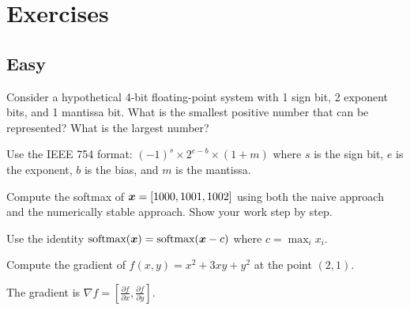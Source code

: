 
\section*{Exercises}

\subsection*{Easy}

\begin{exercisebox}[easy]
\begin{problem}
\label{prob:float-basics}
Consider a hypothetical 4-bit floating-point system with 1 sign bit, 2 exponent bits, and 1 mantissa bit. What is the smallest positive number that can be represented? What is the largest number?
\end{problem}
\begin{hintbox}
Use the IEEE 754 format: $(-1)^s \times 2^{e-b} \times (1 + m)$ where $s$ is the sign bit, $e$ is the exponent, $b$ is the bias, and $m$ is the mantissa.
\end{hintbox}
\end{exercisebox}


\begin{exercisebox}[easy]
\begin{problem}
\label{prob:softmax-stability}
Compute the softmax of $\boldsymbol{x} = [1000, 1001, 1002]$ using both the naive approach and the numerically stable approach. Show your work step by step.
\end{problem}
\begin{hintbox}
Use the identity $\text{softmax}(\boldsymbol{x}) = \text{softmax}(\boldsymbol{x} - c)$ where $c = \max_i x_i$.
\end{hintbox}
\end{exercisebox}


\begin{exercisebox}[easy]
\begin{problem}
\label{prob:gradient-computation}
Compute the gradient of $f(x, y) = x^2 + 3xy + y^2$ at the point $(2, 1)$.
\end{problem}
\begin{hintbox}
The gradient is $\nabla f = \left[\frac{\partial f}{\partial x}, \frac{\partial f}{\partial y}\right]$.
\end{hintbox}
\end{exercisebox}


